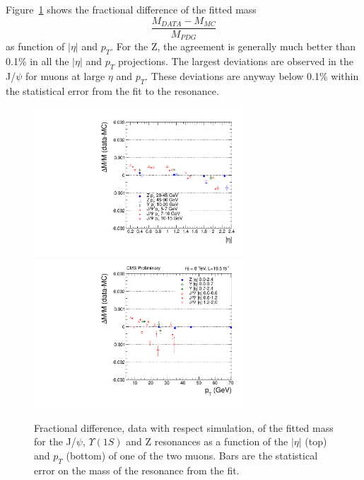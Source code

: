 Figure~\ref{fig:ScaleDATAMC_8TeV} shows the fractional difference of the fitted mass
\[
\frac{M_{DATA}-M_{MC}}{M_{PDG}}
\]
as function of $|\eta|$ and  $p_T$. For the Z, the agreement is
generally much better than 0.1\% in all the $|\eta|$ and $p_T$ projections.
The largest deviations are observed in the J/$\psi$ for muons at large
$\eta$ and $p_T$. These deviations are anyway below 0.1\% within the
statistical error from the fit to the resonance.
\begin{figure}[hbtp]  
\begin{center}
\includegraphics[width=0.7\textwidth]{figures/H4l_Style/2012_22Jan2013ReReco/ScaleEta_afterCorrection_V2}
\includegraphics[width=0.7\textwidth]{figures/H4l_Style/2012_22Jan2013ReReco/ScalePt_afterCorrection_V2} 
 \hspace{1cm} 
   \caption{Fractional difference, data with respect simulation, of the fitted mass for the J/$\psi$,
     $\Upsilon(1S)$ and Z resonances as a function of the $|\eta|$ (top)
     and $p_T$ (bottom) of one of the two muons. Bars are the
     statistical error on the mass of the resonance from the fit.
   \label{fig:ScaleDATAMC_8TeV}}
 \end{center}
\end{figure} 


